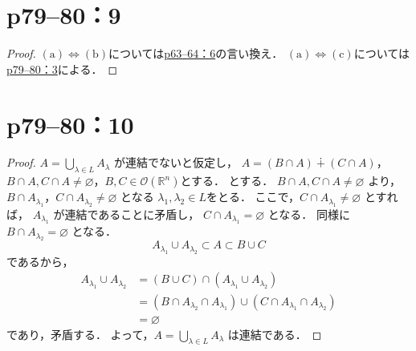 \section*{p79--80：9}

\begin{leftbar}
    \begin{proof}
        $(\text{a})\iff (\text{b})$については\hyperref[p63--64：6]{p63--64：6}の言い換え．
        $(\text{a})\iff  (\text{c})$については\hyperref[p79--80：3]{p79--80：3}による．
    \end{proof}
\end{leftbar}


\section*{p79--80：10} \label{p79--80：10}

\begin{leftbar}
    \begin{proof}
        $A = \bigcup_{\lambda \in L} A_\lambda$ が連結でないと仮定し，
        $A =(B \cap A)\dotplus(C \cap A)$，$B \cap A ,C \cap A \neq \varnothing$，$B, C \in \mathcal{O}(\mathbb{R}^n)$とする．
        とする．
        $ B \cap A ,C \cap A \neq \varnothing$ より，$B \cap A_{\lambda_1}$，$C \cap A_{\lambda_2} \neq \varnothing$
        となる $\lambda_1,\lambda_2 \in L$をとる．
        ここで，$C \cap A_{\lambda_1} \neq \varnothing$ とすれば，
        $A_{\lambda_1}$ が連結であることに矛盾し，
        $C \cap A_{\lambda_1} = \varnothing$ となる．
        同様に $B \cap A_{\lambda_2} = \varnothing$ となる．
        \[
            A_{\lambda_1} \cup A_{\lambda_2} \subset  A \subset B \cup C
        \]
        であるから，
        \begin{align*}
            A_{\lambda_1} \cup A_{\lambda_2} & =( B \cup C) \cap (A_{\lambda_1} \cup A_{\lambda_2})                                      \\
                                             & =(B \cap A_{\lambda_2} \cap A_{\lambda_1}) \cup (C \cap A_{\lambda_1} \cap A_{\lambda_2}) \\
                                             & =\varnothing
        \end{align*}
        であり，矛盾する．
        よって，$A = \bigcup_{\lambda \in L} A_\lambda$ は連結である．
    \end{proof}
\end{leftbar}


